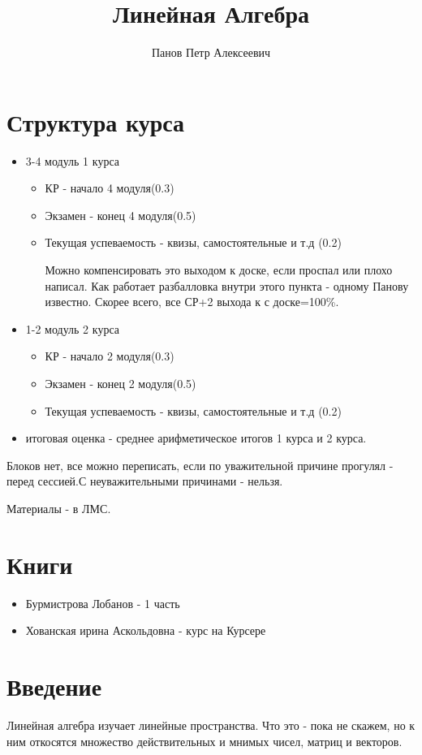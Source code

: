 \documentclass{article}
\title{Линейная Алгебра}
\author{Панов Петр Алексеевич}
\begin{document}
\maketitle
 
\tableofcontents

\section*{Структура курса}
\begin{itemize}
\item 3-4 модуль 1 курса
\begin{itemize}
\item КР - начало 4 модуля(0.3)
\item Экзамен - конец 4 модуля(0.5)
\item Текущая успеваемость - квизы, самостоятельные и т.д (0.2)

Можно компенсировать это выходом к доске, если проспал или плохо написал. Как работает разбалловка внутри этого пункта - одному Панову известно. Скорее всего, все СР+2 выхода к с доске=100\%.
\end{itemize}

\item 1-2 модуль 2 курса
\begin{itemize}
\item КР - начало 2 модуля(0.3)
\item Экзамен - конец 2 модуля(0.5)
\item Текущая успеваемость - квизы, самостоятельные и т.д (0.2)
\end{itemize}
\item итоговая оценка - среднее арифметическое итогов 1 курса и 2 курса.
\end{itemize}

Блоков нет, все можно переписать, если по уважительной причине прогулял - перед сессией.С неуважительными причинами - нельзя.

Материалы - в ЛМС.

\section*{Книги}
\begin{itemize}
\item Бурмистрова Лобанов - 1 часть
\item Хованская ирина Аскольдовна - курс на Курсере
\end{itemize}

\section*{Введение}
Линейная алгебра изучает линейные пространства. Что это - пока не скажем, но к ним откосятся множество действительных и мнимых чисел, матриц и векторов.
\end{document}
